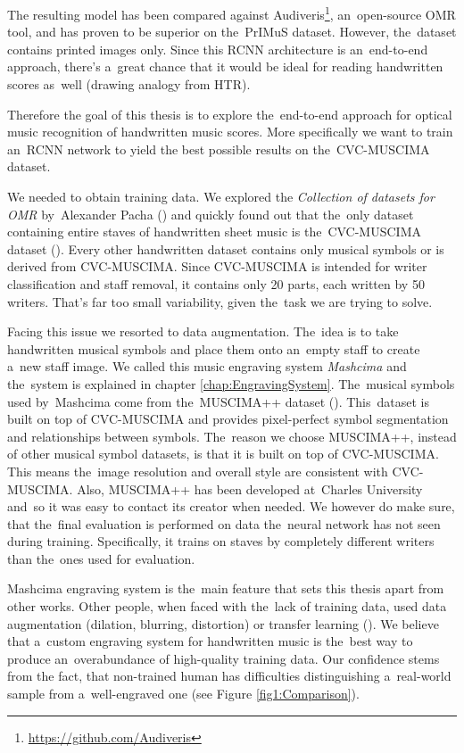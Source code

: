 The resulting model has been compared against Audiveris\footnote{\href{https://github.com/Audiveris}{https://github.com/Audiveris}}, an~open-source OMR tool, and has proven to be superior on the~PrIMuS dataset. However, the~dataset contains printed images only. Since this RCNN architecture is an~end-to-end approach, there's a~great chance that it would be ideal for reading handwritten scores as~well (drawing analogy from HTR).

Therefore the goal of this thesis is to explore the~end-to-end approach for optical music recognition of handwritten music scores. More specifically we want to train an~RCNN network to yield the best possible results on the~CVC-MUSCIMA dataset.

\overfullrule=0pt %
We needed to obtain training data. We explored the \emph{Collection of datasets for OMR} by~Alexander Pacha (\cite{Pacha}) and quickly found out that the~only dataset containing entire staves of handwritten sheet music is the~CVC-MUSCIMA dataset (\cite{CvcMuscima}). Every other handwritten dataset contains only musical symbols or is derived from CVC-MUSCIMA. Since CVC-MUSCIMA is intended for writer classification and staff removal, it contains only 20 parts, each written by 50 writers. That's far too small variability, given the~task we are trying to solve.

Facing this issue we resorted to data augmentation. The~idea is to take handwritten musical symbols and place them onto an~empty staff to create a~new staff image. We called this music engraving system \emph{Mashcima} and the~system is explained in chapter \ref{chap:EngravingSystem}. The~musical symbols used by~Mashcima come from the~MUSCIMA++ dataset (\cite{MuscimaPP}). This~dataset is built on top of CVC-MUSCIMA and provides pixel-perfect symbol segmentation and relationships between symbols. The~reason we choose MUSCIMA++, instead of other musical symbol datasets, is that it is built on top of CVC-MUSCIMA. This means the~image resolution and overall style are consistent with CVC-MUSCIMA. Also, MUSCIMA++ has been developed at~Charles University and~so it was easy to contact its creator when needed. We however do make sure, that the~final evaluation is performed on data the~neural network has not seen during training. Specifically, it trains on staves by completely different writers than the~ones used for evaluation.

Mashcima engraving system is the~main feature that sets this thesis apart from other works. Other people, when faced with the~lack of training data, used data augmentation (dilation, blurring, distortion) or transfer learning (\cite{HmrBaseline}). We believe that a~custom engraving system for handwritten music is the~best way to produce an~overabundance of high-quality training data. Our confidence stems from the fact, that non-trained human has difficulties distinguishing a~real-world sample from a~well-engraved one (see Figure \ref{fig1:Comparison}).

